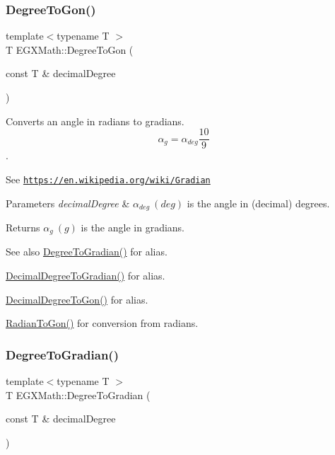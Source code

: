 \subsubsection{\texorpdfstring{Degree\+To\+Gon()}{DegreeToGon()}}
{\footnotesize\ttfamily template$<$typename T $>$ \\
T E\+G\+X\+Math\+::\+Degree\+To\+Gon (\begin{DoxyParamCaption}\item[{const T \&}]{decimal\+Degree }\end{DoxyParamCaption})}



Converts an angle in radians to gradians. \[\alpha_{g}=\alpha_{deg}\frac{10}{9}\]. 

See \href{https://en.wikipedia.org/wiki/Gradian}{\tt https\+://en.\+wikipedia.\+org/wiki/\+Gradian} 
\begin{DoxyParams}{Parameters}
{\em decimal\+Degree} & $\alpha_{deg}\ (deg)$ is the angle in (decimal) degrees. \\
\hline
\end{DoxyParams}
\begin{DoxyReturn}{Returns}
$\alpha_{g}\ (g)$ is the angle in gradians. 
\end{DoxyReturn}
\begin{DoxySeeAlso}{See also}
\mbox{\hyperlink{group___e_g_x_math-_angle_conversions-_degree_ga25bb5506b3f66fff7a1b85bf7bd795b3}{Degree\+To\+Gradian()}} for alias. 

\mbox{\hyperlink{group___e_g_x_math-_angle_conversions-_decimal_degree_ga3ac6f1ceb36a4938cdf3b55554734c99}{Decimal\+Degree\+To\+Gradian()}} for alias. 

\mbox{\hyperlink{group___e_g_x_math-_angle_conversions-_decimal_degree_gaeb333a1ad0aeb913c025fbd1be85fcb3}{Decimal\+Degree\+To\+Gon()}} for alias. 

\mbox{\hyperlink{group___e_g_x_math-_angle_conversions-_radian_ga36912e5a810b64c271c4dafc17f4ca45}{Radian\+To\+Gon()}} for conversion from radians. 
\end{DoxySeeAlso}
\mbox{\label{group___e_g_x_math-_angle_conversions-_degree_ga25bb5506b3f66fff7a1b85bf7bd795b3}} 
\subsubsection{\texorpdfstring{Degree\+To\+Gradian()}{DegreeToGradian()}}
{\footnotesize\ttfamily template$<$typename T $>$ \\
T E\+G\+X\+Math\+::\+Degree\+To\+Gradian (\begin{DoxyParamCaption}\item[{const T \&}]{decimal\+Degree }\end{DoxyParamCaption})}



